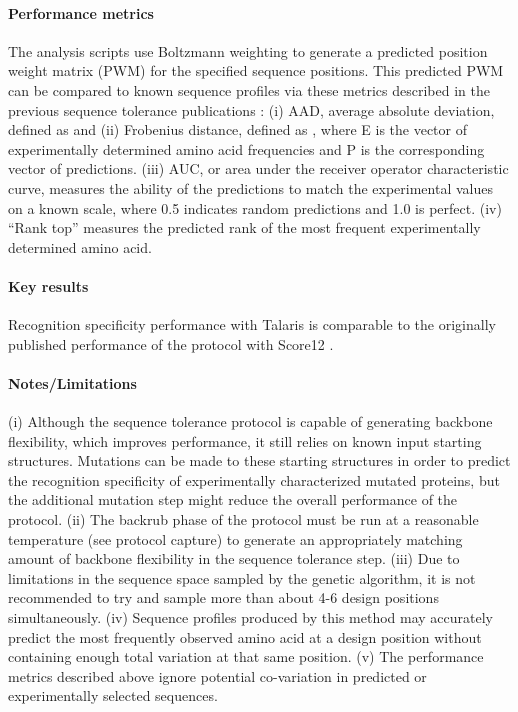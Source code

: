 \paragraph{Performance metrics}
The analysis scripts use Boltzmann weighting to generate a predicted position weight matrix (PWM) for the specified sequence positions. This predicted PWM can be compared to known sequence profiles via these metrics described in the previous sequence tolerance publications \cite{smith_predicting_2011,smith_structure-based_2010}: (i) AAD, average absolute deviation, defined as  and (ii) Frobenius distance, defined as , where E is the vector of experimentally determined amino acid frequencies and P is the corresponding vector of predictions. (iii) AUC, or area under the receiver operator characteristic curve, measures the ability of the predictions to match the experimental values on a known scale, where 0.5 indicates random predictions and 1.0 is perfect. (iv) ``Rank top'' measures the predicted rank of the most frequent experimentally determined amino acid.

\paragraph{Key results}
Recognition specificity performance with Talaris is comparable to the originally published performance of the protocol with Score12 \cite{smith_predicting_2011,smith_structure-based_2010}.

\paragraph{Notes/Limitations}
(i) Although the sequence tolerance protocol is capable of generating backbone flexibility, which improves performance, it still relies on known input starting structures. Mutations can be made to these starting structures in order to predict the recognition specificity of experimentally characterized mutated proteins, but the additional mutation step might reduce the overall performance of the protocol. (ii) The backrub phase of the protocol must be run at a reasonable temperature (see protocol capture) to generate an appropriately matching amount of backbone flexibility in the sequence tolerance step. (iii) Due to limitations in the sequence space sampled by the genetic algorithm, it is not recommended to try and sample more than about 4-6 design positions simultaneously. (iv) Sequence profiles produced by this method may accurately predict the most frequently observed amino acid at a design position without containing enough total variation at that same position. (v) The performance metrics described above ignore potential co-variation in predicted or experimentally selected sequences.


